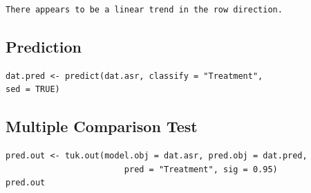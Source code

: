 \documentclass[a4paper, 10pt, fleqn, twosided]{memoir}
\begin{document}
\begin{tcolorbox}[title = Example 6 Variogram Interpretation]
\begin{verbatim}
There appears to be a linear trend in the row direction.
\end{verbatim}
\end{tcolorbox}

\subsection{Prediction}

\begin{tcolorbox}[title = Example 6 predicted values]
\begin{verbatim}
dat.pred <- predict(dat.asr, classify = "Treatment",
sed = TRUE)
\end{verbatim}
\end{tcolorbox}

\subsection{Multiple Comparison Test}

\begin{tcolorbox}[title = Example 6 Tukey's multiple comparison]
\begin{verbatim}
pred.out <- tuk.out(model.obj = dat.asr, pred.obj = dat.pred,
                        pred = "Treatment", sig = 0.95)
pred.out
\end{verbatim}
\end{tcolorbox}
\clearpage
\end{document}
